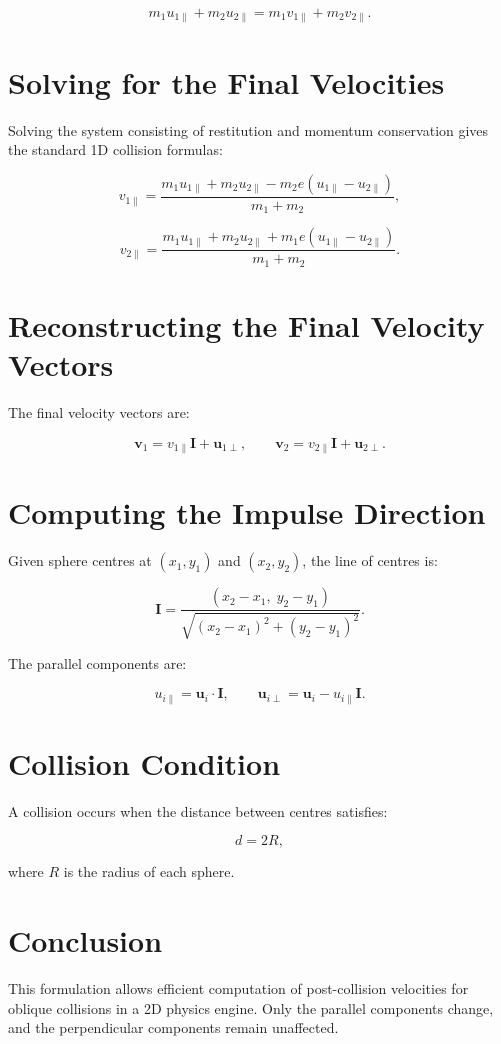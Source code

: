 \documentclass[12pt]{article}
\begin{document}
\[
m_1 u_{1\parallel} + m_2 u_{2\parallel}
= m_1 v_{1\parallel} + m_2 v_{2\parallel}.
\]



\section{Solving for the Final Velocities}

Solving the system consisting of restitution and momentum conservation
gives the standard 1D collision formulas:



\[
v_{1\parallel}
= \frac{m_1 u_{1\parallel} + m_2 u_{2\parallel}
      - m_2 e (u_{1\parallel} - u_{2\parallel})}
      {m_1 + m_2},
\]





\[
v_{2\parallel}
= \frac{m_1 u_{1\parallel} + m_2 u_{2\parallel}
      + m_1 e (u_{1\parallel} - u_{2\parallel})}
      {m_1 + m_2}.
\]



\section{Reconstructing the Final Velocity Vectors}

The final velocity vectors are:


\[
\mathbf{v}_1 = v_{1\parallel}\mathbf{I} + \mathbf{u}_{1\perp},
\qquad
\mathbf{v}_2 = v_{2\parallel}\mathbf{I} + \mathbf{u}_{2\perp}.
\]



\section{Computing the Impulse Direction}

Given sphere centres at \((x_1,y_1)\) and \((x_2,y_2)\), the line of centres is:


\[
\mathbf{I} = \frac{(x_2 - x_1,\; y_2 - y_1)}
                  {\sqrt{(x_2 - x_1)^2 + (y_2 - y_1)^2}}.
\]



The parallel components are:


\[
u_{i\parallel} = \mathbf{u}_i \cdot \mathbf{I},
\qquad
\mathbf{u}_{i\perp} = \mathbf{u}_i - u_{i\parallel}\mathbf{I}.
\]



\section{Collision Condition}

A collision occurs when the distance between centres satisfies:


\[
d = 2R,
\]


where \(R\) is the radius of each sphere.

\section{Conclusion}

This formulation allows efficient computation of post-collision velocities
for oblique collisions in a 2D physics engine. Only the parallel components
change, and the perpendicular components remain unaffected.
\end{document}
